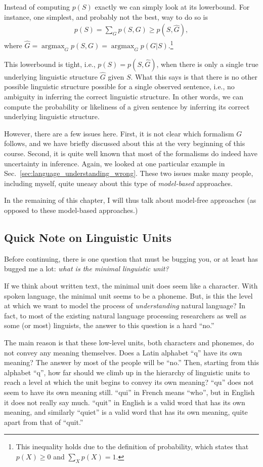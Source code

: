 \documentclass{report}
\DeclareMathOperator*{\argmax}{\arg \max}
\begin{document}
Instead of computing $p(S)$ exactly we can simply look at its lowerbound. For
instance, one simplest, and probably not the best, way to do so is
\begin{align*}
    p(S) = \sum_G p(S,G) \geq p(S, \hat{G}),
\end{align*}
where $\hat{G} = \argmax_G p(S,G) = \argmax_G p(G|S)$.\footnote{
    This inequality holds due to the definition of probability, which states
    that $p(X)\geq 0$ and $\sum_X p(X) = 1$.
}

This lowerbound is tight, i.e., $p(S) = p(S, \hat{G})$, when there is only a
single true underlying linguistic structure $\hat{G}$ given $S$. What this says
is that there is no other possible linguistic structure possible for a single
observed sentence, i.e., no ambiguity in inferring the correct linguistic
structure.  In other words, we can compute the probability or likeliness of a
given sentence by inferring its correct underlying linguistic structure.

However, there are a few issues here. First, it is not clear which formalism $G$
follows, and we have briefly discussed about this at the very beginning of this
course. Second, it is quite well known that most of the formalisms do indeed
have uncertainty in inference. Again, we looked at one particular example in
Sec.~\ref{sec:language_understanding_wrong}. These two issues make many people,
including myself, quite uneasy about this type of {\em model-based} approaches. 

In the remaining of this chapter, I will thus talk about model-free approaches
(as opposed to these model-based approaches.)

\subsection{Quick Note on Linguistic Units}

Before continuing, there is one question that must be bugging you, or at least
has bugged me a lot: {\em what is the minimal linguistic unit?} 

If we think about written text, the minimal unit does seem like a character.
With spoken language, the minimal unit seems to be a phoneme. But, is this the
level at which we want to model the process of {\em understanding} natural
language? In fact, to most of the existing natural language processing
researchers as well as some (or most) linguists, the answer to this question is
a hard ``no.''

The main reason is that these low-level units, both characters and phonemes, do
not convey any meaning themselves. Does a Latin alphabet ``q'' have its own
meaning? The answer by most of the people will be ``no.'' Then, starting from
this alphabet ``q'', how far should we climb up in the hierarchy of linguistic
units to reach a level at which the unit begins to convey its own meaning?
``qu'' does not seem to have its own meaning still. ``qui'' in French means
``who'', but in English it does not really say much. ``quit'' in English is a
valid word that has its own meaning, and similarly ``quiet'' is a valid word
that has its own meaning, quite apart from that of ``quit.''
\end{document}
